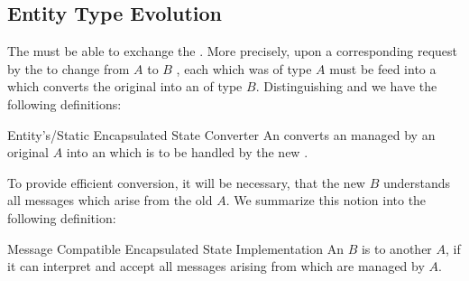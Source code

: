 \documentclass[a4paper, 12pt]{book}
\begin{document}
\subsection{Entity Type Evolution}

The \SYNEIGHT must be able to exchange the . More precisely, upon a corresponding request by the
 to change from  $A$ to  $B$ , each  which was of type
$A$ must be feed into a  which converts the original
 into an  of type $B$. 
%
Distinguishing  and  we have the
following definitions:
\begin{definition*}{Entity's/Static Encapsulated State Converter}
  An  converts an
   managed by an original  $A$ into an 
  which is to be handled by the new .
\end{definition*}
%
To provide efficient conversion, it will be necessary, that the new  $B$ understands all messages which arise from the old
 $A$. We summarize this notion into the
following definition:
\begin{definition*}{Message Compatible Encapsulated State Implementation}
  An  $B$ is  to
  another  $A$, if it can interpret and
  accept all messages arising from 
  which are managed by $A$.
\end{definition*}
\end{document}
